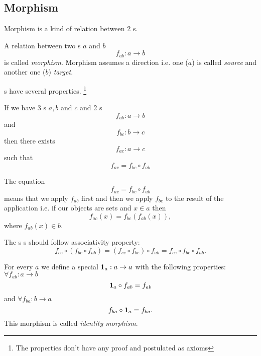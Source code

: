 \subsection{Morphism}
Morphism is a kind of relation between 2 s. 
\begin{definition}[Morphism]
  \label{def:morphism}
  A relation between two s $a$ and $b$ 
  \[
  f_{ab}: a \rightarrow b
  \]
  is called
  \textit{morphism}. Morphism assumes a direction i.e. one 
  ($a$) is called \textit{source} and another one ($b$) \textit{target}.
\end{definition}

s have several properties. \footnote{The
  properties don't have any proof and postulated as axioms}
\begin{property}[Composition]
  \label{prop:composition}
  If we have 3 s $a, b$ and $c$ and 2
  s 
  \[
  f_{ab} : a \rightarrow b
  \]
  and 
  \[
  f_{bc} : b \rightarrow c
  \]
  then there exists  
  \[
  f_{ac} : a \rightarrow c
  \]
  such that
  \[
  f_{ac} = f_{bc} \circ f_{ab}
  \]
\end{property}

\begin{remark}[Composition]
  \label{rem:composition}
  The equation
  \[
  f_{ac} = f_{bc} \circ f_{ab}
  \]
  means that we apply $f_{ab}$ first and then we apply $f_{bc}$ to the
  result of the application i.e. if our objects are sets and $x \in a$
  then 
  \[
  f_{ac} ( x ) = f_{bc} ( f_{ab} ( x ) ),
  \]
  where $f_{ab} ( x ) \in b$.
\end{remark}

\begin{property}[Associativity]
  \label{prop:associativity}
  The s s should
  follow associativity property:
  \[
  f_{ce} \circ (f_{bc} \circ f_{ab}) = (f_{ce} \circ f_{bc}) \circ
  f_{ab} = f_{ce} \circ f_{bc} \circ f_{ab}.
  \]
\end{property}

\begin{definition}
  \label{def:id}
  For every  $a$ we define a special
   $\idarrow[a] : a \rightarrow a$ with the
  following properties: $\forall f_{ab} : a \rightarrow b$
  \begin{equation}
    \idarrow[a] \circ f_{ab} = f_{ab}
    \label{eq:leftid}
  \end{equation}
  and
  $\forall f_{ba} : b \rightarrow a$
  \begin{equation}
    f_{ba} \circ \idarrow[a]  = f_{ba}.
    \label{eq:rightid}
  \end{equation}
  This morphism is called \textit{identity morphism}.
\end{definition}

